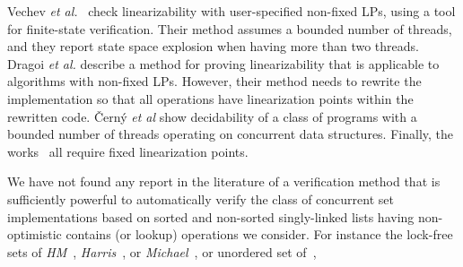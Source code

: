 %
Vechev {\it et al.}~\cite{Vechev:spin09}
check linearizability with user-specified non-fixed LPs,
using a tool for finite-state verification.
Their method assumes a bounded number of threads, and
they report state space explosion when having more than two threads.
%
Dragoi  {\it et al.} \cite{Henzinger:CAV13} describe a method for proving
linearizability that is applicable to algorithms with non-fixed LPs.
%
However, their method needs to rewrite the implementation so that all operations 
have linearization points within the rewritten code.
%
\v{C}ern{\'y} {\it et al} \cite{CernyRZCA:CAV10} show decidability of a class
of programs with a bounded number of threads operating on concurrent data structures.
%
%
Finally, the works~\cite{AHHR:integrated,BLMRS:cav08,Vafeiadis:vmcai09}
all require fixed linearization points.

We have not found any report in the literature of a
verification method that is sufficiently powerful to
automatically verify the class of concurrent set
implementations based on sorted and non-sorted
singly-linked lists having non-optimistic contains (or lookup) operations we consider. For instance %
the lock-free sets of {\it HM}~\cite{ArtOfMpP},
{\it Harris}~\cite{Harris:list}, or {\it Michael}~\cite{Michael:list},
or unordered set of~\cite{Zhang:unorderedlist},



